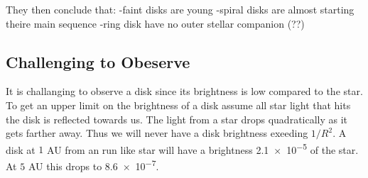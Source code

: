They then conclude that: 
-faint disks are young
-spiral disks are almost starting theire main sequence
-ring disk have no outer stellar companion (??)  


\subsection{Challenging to Obeserve}

It is challanging to observe a disk since its brightness is low compared to the star. To get an upper limit on the brightness of a disk assume all star light that hits the disk is reflected towards us. The light from a star drops quadratically as it gets farther away. Thus we will never have a disk brightness exeeding $1/R^2$. A disk at $1$ AU from an run like star will have a brightness \num{2.1e-5} of the star. At $5$ AU this drops to \num{8.6e-7}. 


